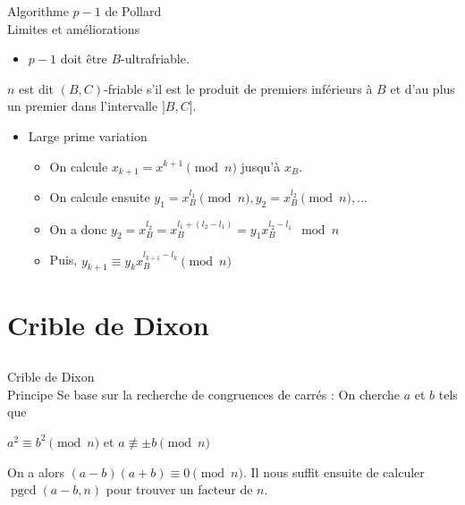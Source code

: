 \documentclass[utf8,10pt,french]{beamer}
\DeclareMathOperator{\pgcd}{pgcd}
\begin{document}
\begin{frame}{Algorithme $p - 1$ de Pollard \\ Limites et améliorations}
\begin{itemize}
\item $p - 1$ doit être $B$-ultrafriable.
\end{itemize} \pause
\begin{definition}
$n$ est dit $(B, C)$-friable s’il est le produit de premiers inférieurs à $B$ et d’au plus un premier dans l’intervalle $]B, C].$ \pause
\end{definition}
\begin{itemize}
\item Large prime variation \pause
\begin{itemize}
\item On calcule $x_{k + 1} = x^{k+1} \pmod n$ jusqu'à $x_B.$ \pause
\item On calcule ensuite $y_1 = x_B^{l_1} \pmod n, y_2 = x_B^{l_2} \pmod n, ...$ \pause
\item On a donc  $y_2 = x_B^{l_2} = x_B^{l_1 + (l_2 - l_1)} = y_1 x_B^{l_2 - l_1} \mod n$
\item Puis, $y_{k + 1} \equiv  y_kx_B^{l_{k+1} - l_k} \pmod n$
\end{itemize}
\end{itemize}
\end{frame}

\section{Crible de Dixon}
\subsection{}
\begin{frame}{Crible de Dixon \\ Principe}
Se base sur la recherche de congruences de carrés :
On cherche $a$ et $b$ tels que
\begin{center}
$a^2 \equiv b^2 \pmod n$ et $a \not\equiv \pm{b} \pmod n$
\end{center} \pause
On a alors $(a - b)(a + b) \equiv 0 \pmod n.$
Il nous suffit ensuite de calculer $\pgcd(a - b, n)$ pour trouver un facteur de $n.$
\end{frame}
\end{document}

